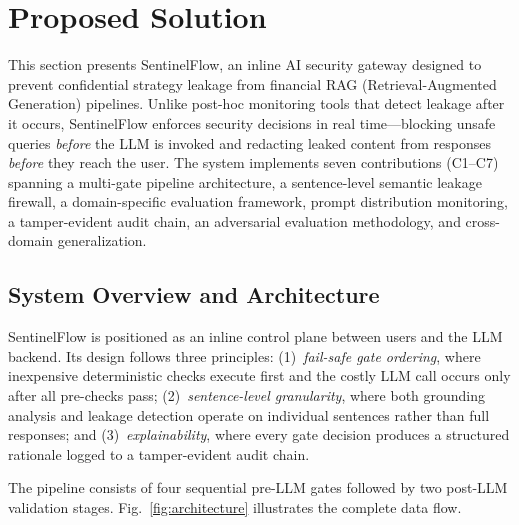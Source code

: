 \documentclass[journal]{IEEEtran}
\begin{document}
\section{Proposed Solution}
\label{Sect:Proposed_Solution}
This section presents SentinelFlow, an inline AI security gateway designed to prevent confidential strategy leakage from financial RAG (Retrieval-Augmented Generation) pipelines. Unlike post-hoc monitoring tools that detect leakage after it occurs, SentinelFlow enforces security decisions in real time---blocking unsafe queries \textit{before} the LLM is invoked and redacting leaked content from responses \textit{before} they reach the user. The system implements seven contributions (C1--C7) spanning a multi-gate pipeline architecture, a sentence-level semantic leakage firewall, a domain-specific evaluation framework, prompt distribution monitoring, a tamper-evident audit chain, an adversarial evaluation methodology, and cross-domain generalization.


\subsection{System Overview and Architecture}
\label{Sect:System_Overview}

SentinelFlow is positioned as an inline control plane between users and the LLM backend. Its design follows three principles: (1)~\textit{fail-safe gate ordering}, where inexpensive deterministic checks execute first and the costly LLM call occurs only after all pre-checks pass; (2)~\textit{sentence-level granularity}, where both grounding analysis and leakage detection operate on individual sentences rather than full responses; and (3)~\textit{explainability}, where every gate decision produces a structured rationale logged to a tamper-evident audit chain.

The pipeline consists of four sequential pre-LLM gates followed by two post-LLM validation stages. Fig.~\ref{fig:architecture} illustrates the complete data flow.
\end{document}
